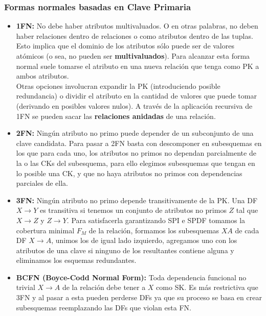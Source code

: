 \subsubsection*{Formas normales basadas en Clave Primaria}
\begin{itemize}
    \item \textbf{1FN:} No debe haber atributos multivaluados. O en otras palabras, no deben haber relaciones dentro de relaciones o como atributos dentro de las tuplas. Esto implica que el dominio de los atributos sólo puede ser de valores atómicos (o sea, no pueden ser \textbf{multivaluados}). Para alcanzar esta forma normal suele tomarse el atributo en una nueva relación que tenga como PK a ambos atributos. \\
    Otras opciones involucran expandir la PK (introduciendo posible redundancia) o dividir el atributo en la cantidad de valores que puede tomar (derivando en posibles valores nulos). A través de la aplicación recursiva de 1FN se pueden sacar las \textbf{relaciones anidadas} de una relación.
    \item \textbf{2FN:} Ningún atributo no primo puede depender de un subconjunto de una clave candidata. Para pasar a 2FN basta con descomponer en subesquemas en los que para cada uno, los atributos no primos no dependan parcialmente de la o las CKs del subesquema, para ello elegimos subesquemas que tengan en lo posible una CK, y que no haya atributos no primos con dependencias parciales de ella.
    \item \textbf{3FN:} Ningún atributo no primo depende transitivamente de la PK. Una DF $X \rightarrow Y$ es transitiva si tenemos un conjunto de atributos no primos $Z$ tal que $X \rightarrow Z$ y $Z \rightarrow Y$. Para satisfacerla garantizando SPI e SPDF tomamos la cobertura minimal $F_M$ de la relación, formamos los subesquemas $XA$ de cada DF $X \rightarrow A$, unimos los de igual lado izquierdo, agregamos uno con los atributos de una clave si ninguno de los resultantes contiene alguna y eliminamos los esquemas redundantes.
    \item \textbf{BCFN (Boyce-Codd Normal Form):} Toda dependencia funcional no trivial $X \rightarrow A$ de la relación debe tener a $X$ como SK. Es más restrictiva que 3FN y al pasar a esta pueden perderse DFs ya que su proceso se basa en crear subesquemas reemplazando las DFs que violan esta FN.
\end{itemize}


